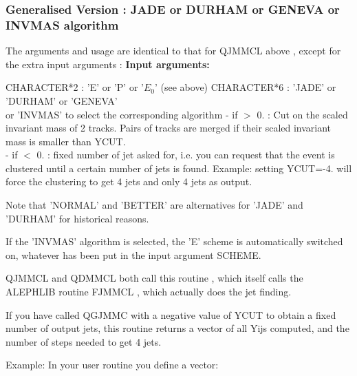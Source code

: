  
\par
\subsubsection{\label{sec-QGJMMC}Generalised Version : JADE or DURHAM or GENEVA or INVMAS algorithm}
\par
{}
\par
 The arguments and usage are identical to that for QJMMCL above , except for the extra input arguments :
{\bf Input arguments:}
\begin{indentlist}{ 2.50cm}{ 2.75cm}
 CHARACTER*2 : 'E' or 'P' or '$E_0$' (see above)
 CHARACTER*6 : 'JADE' or 'DURHAM' or 'GENEVA'\\
 or 'INVMAS' to select the corresponding algorithm
  - if $>$ 0. :  Cut on the scaled invariant mass of 2 tracks.
Pairs of tracks are merged if their scaled invariant mass is smaller
than YCUT.\\
                   - if $<$ 0. : fixed number of jet asked for, i.e. you can request that the event is clustered until a certain
                   number of jets is found. Example: setting YCUT=-4.  will force the clustering to get 4 jets and only 4 jets as
                   output. 

\end{indentlist}
\par
    Note that 'NORMAL' and 'BETTER' are alternatives for 'JADE' and 'DURHAM' for historical reasons.
\par
    If the 'INVMAS' algorithm is selected, the 'E' scheme is automatically switched on, whatever has been put in the input argument
    SCHEME.
\par

 QJMMCL and QDMMCL both call this routine , which itself calls the ALEPHLIB routine
 FJMMCL , which actually does the jet finding.


\par
{}                                 
\par
    If you have called QGJMMC with a negative value of YCUT to obtain a fixed number of output jets, this routine returns a vector
    of all Yijs computed, and the number of steps needed to get 4 jets.

 Example:  In your user routine you define a vector:

